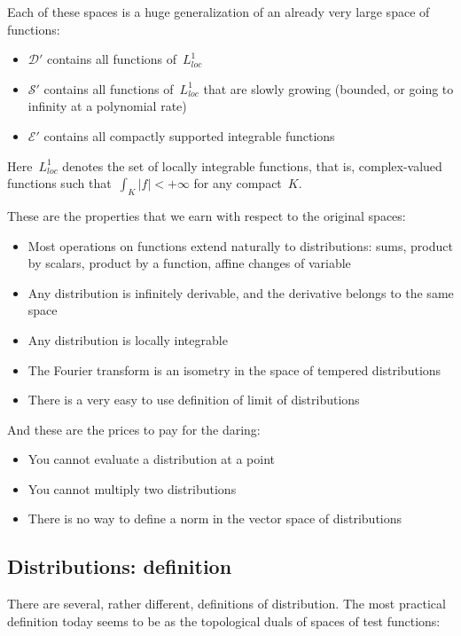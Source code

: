 Each of these spaces is a huge generalization of an already very large
space of functions:
\begin{itemize}
	\item $\mathcal{D}'$ contains all functions of~$L^1_{loc}$
	\item $\mathcal{S}'$ contains all functions of~$L^1_{loc}$ that
		are slowly growing (bounded, or going to infinity at a polynomial
		rate)
	\item $\mathcal{E}'$ contains all compactly supported integrable
		functions
\end{itemize}
Here~$L^1_{loc}$ denotes the set of locally integrable functions,
that is, complex-valued functions such that~$\int_K|f| <+\infty$ for
any compact~$K$.

These are the properties that we earn with respect to the original
spaces:
\begin{itemize}
	\item Most operations on functions extend naturally to
		distributions: sums, product by scalars, product by a function,
		affine changes of variable
	\item Any distribution is infinitely derivable, and the derivative
		belongs to the same space
	\item Any distribution is locally integrable
	\item The Fourier transform is an isometry in the space of
		tempered distributions
	\item There is a very easy to use definition of limit of
		distributions
\end{itemize}

And these are the prices to pay for the daring:
\begin{itemize}
	\item You cannot evaluate a distribution at a point
	\item You cannot multiply two distributions
	\item There is no way to define a norm in the vector space of
		distributions
\end{itemize}

\subsection{Distributions: definition}

There are several, rather different, definitions of distribution.
The most practical definition today seems to be as the topological
duals of spaces of test functions:

